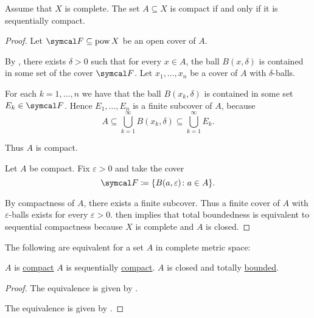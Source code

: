 \begin{theorem}\label{thm:metric_compact_iff_sequentially_compact}
  Assume that \( X \) is complete. The set \( A \subseteq X \) is compact if and only if it is sequentially compact.
\end{theorem}
\begin{proof}
  \Sufficiency Let \( \Cal{F} \subseteq \Pow X \) be an open cover of \( A \).

  By , there exists \( \delta > 0 \) such that for every \( x \in A \), the ball \( B(x, \delta) \) is contained in some set of the cover \( \Cal{F} \). Let \( x_1, \ldots, x_n \) be a cover of \( A \) with \( \delta \)-balls.

  For each \( k = 1, \ldots, n \) we have that the ball \( B(x_k, \delta) \) is contained in some set \( E_k \in \Cal{F} \). Hence \( E_1, \ldots, E_n \) is a finite subcover of \( A \), because
  \begin{equation*}
    A \subseteq \bigcup_{k=1}^\infty B(x_k, \delta) \subseteq \bigcup_{k=1}^\infty E_k.
  \end{equation*}

  Thus \( A \) is compact.

  \Necessity Let \( A \) be compact. Fix \( \varepsilon > 0 \) and take the cover
  \begin{equation*}
    \Cal{F} \coloneqq \{ B(a, \varepsilon) \colon a \in A \}.
  \end{equation*}

  By compactness of \( A \), there exists a finite subcover. Thus a finite cover of \( A \) with \( \varepsilon \)-balls exists for every \( \varepsilon > 0 \).  then implies that total boundedness is equivalent to sequential compactness because \( X \) is complete and \( A \) is closed.
\end{proof}

\begin{corollary}\label{thm:complete_metric_space_compact_conditions}
  The following are equivalent for a set \( A \) in complete metric space:
  \begin{DefEnum}
     \( A \) is \hyperref[def:compact_space]{compact}
     \( A \) is sequentially \hyperref[def:compact_space/convergent_nets]{compact}.
     \( A \) is closed and totally \hyperref[def:totally_bounded_set]{bounded}.
  \end{DefEnum}
\end{corollary}
\begin{proof}
   The equivalence is given by .

   The equivalence is given by .
\end{proof}
